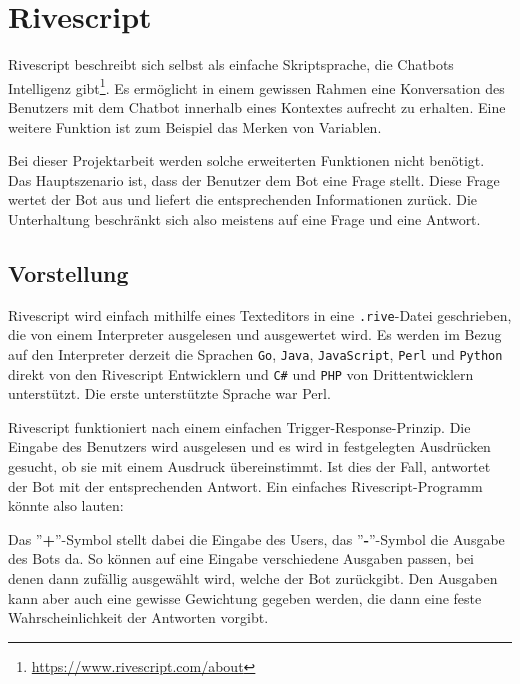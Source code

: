 \chapter{Rivescript} \label{sec:rivescript}
Rivescript beschreibt sich selbst als einfache Skriptsprache, die Chatbots Intelligenz gibt\footnote{\url{https://www.rivescript.com/about}}. Es ermöglicht in einem gewissen Rahmen eine Konversation des Benutzers mit dem Chatbot innerhalb eines Kontextes aufrecht zu erhalten. Eine weitere Funktion ist zum Beispiel das Merken von Variablen.

Bei dieser Projektarbeit werden solche erweiterten Funktionen nicht benötigt. Das Hauptszenario ist, dass der Benutzer dem Bot eine Frage stellt. Diese Frage wertet der Bot aus und liefert die entsprechenden Informationen zurück. Die Unterhaltung beschränkt sich also meistens auf eine Frage und eine Antwort.

\section{Vorstellung}
Rivescript wird einfach mithilfe eines Texteditors in eine \texttt{.rive}-Datei geschrieben, die von einem Interpreter ausgelesen und ausgewertet wird. Es werden im Bezug auf den Interpreter derzeit die Sprachen \texttt{Go}, \texttt{Java}, \texttt{JavaScript}, \texttt{Perl} und \texttt{Python} direkt von den Rivescript Entwicklern und \texttt{C\#} und \texttt{PHP} von Drittentwicklern unterstützt. Die erste unterstützte Sprache war Perl.

Rivescript funktioniert nach einem einfachen Trigger-Response-Prinzip. Die Eingabe des Benutzers wird ausgelesen und es wird in festgelegten Ausdrücken gesucht, ob sie mit einem Ausdruck übereinstimmt. Ist dies der Fall, antwortet der Bot mit der entsprechenden Antwort.
Ein einfaches Rivescript-Programm könnte also lauten:


Das ''\textbf{+}''-Symbol stellt dabei die Eingabe des Users, das ''\textbf{-}''-Symbol die Ausgabe des Bots da. So können auf eine Eingabe verschiedene Ausgaben passen, bei denen dann zufällig ausgewählt wird, welche der Bot zurückgibt. Den Ausgaben kann aber auch eine gewisse Gewichtung gegeben werden, die dann eine feste Wahrscheinlichkeit der Antworten vorgibt.


